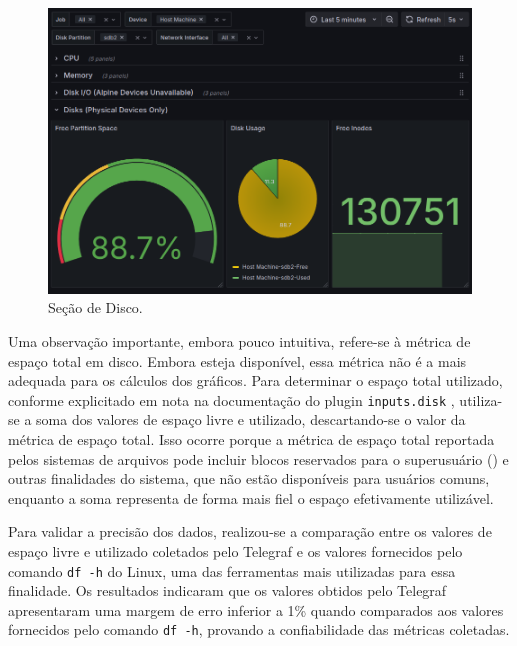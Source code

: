 {\begin{figure}[H]
\centering
\color{red}
\setlength{\abovecaptionskip}{-20pt}
\includegraphics[width=\textwidth]{Imagens/chap04/dashboard/disk.png}
\caption{Seção de Disco.}
\label{fig:dashboard-disk}
\end{figure}

Uma observação importante, embora pouco intuitiva, refere-se à métrica de espaço total em disco. Embora esteja disponível, essa métrica não é a mais adequada para os cálculos dos gráficos. Para determinar o espaço total utilizado, conforme explicitado em nota na documentação do plugin \verb|inputs.disk| \citep{inputsdisk2025}, utiliza-se a soma dos valores de espaço livre e utilizado, descartando-se o valor da métrica de espaço total. Isso ocorre porque a métrica de espaço total reportada pelos sistemas de arquivos pode incluir blocos reservados para o superusuário () e outras finalidades do sistema, que não estão disponíveis para usuários comuns, enquanto a soma  representa de forma mais fiel o espaço efetivamente utilizável.

Para validar a precisão dos dados, realizou-se a comparação entre os valores de espaço livre e utilizado coletados pelo Telegraf e os valores fornecidos pelo comando \verb|df -h| do Linux, uma das ferramentas mais utilizadas para essa finalidade. Os resultados indicaram que os valores obtidos pelo Telegraf apresentaram uma margem de erro inferior a 1\% quando comparados aos valores fornecidos pelo comando \verb|df -h|, provando a confiabilidade das métricas coletadas.

}
